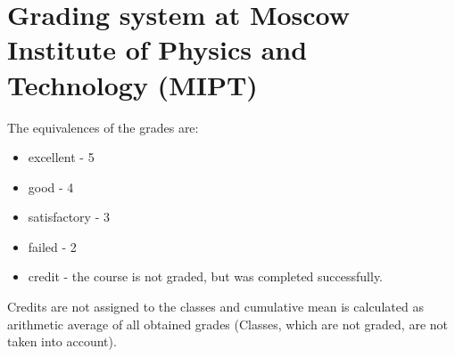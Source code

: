 \documentclass[letterpaper,12pt]{article}
\begin{document}
\section*{Grading system at Moscow Institute of Physics and Technology (MIPT)}
The equivalences of the grades are:
\begin{itemize}
\item excellent - 5
\item good - 4
\item satisfactory - 3
\item failed - 2
\item credit - the course is not graded, but was completed successfully.
\end{itemize}
Credits are not assigned to the classes and cumulative mean is calculated as arithmetic average of all obtained grades (Classes, which are not graded, 
are not taken into account). 
\end{document}
